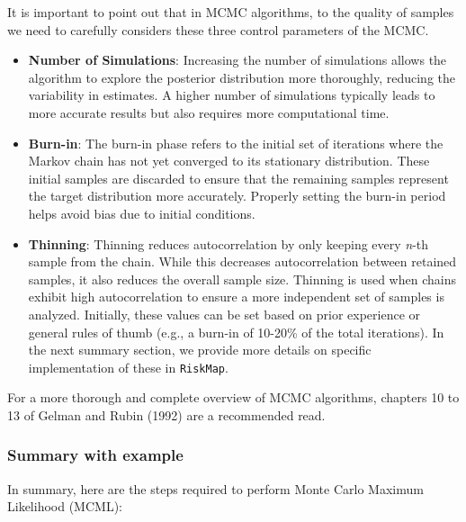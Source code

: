 \documentclass[
  letterpaper,
]{krantz}
\begin{document}
It is important to point out that in MCMC algorithms, to the quality of
samples we need to carefully considers these three control parameters of
the MCMC.

\begin{itemize}
\item
  \textbf{Number of Simulations}: Increasing the number of simulations
  allows the algorithm to explore the posterior distribution more
  thoroughly, reducing the variability in estimates. A higher number of
  simulations typically leads to more accurate results but also requires
  more computational time.
\item
  \textbf{Burn-in}: The burn-in phase refers to the initial set of
  iterations where the Markov chain has not yet converged to its
  stationary distribution. These initial samples are discarded to ensure
  that the remaining samples represent the target distribution more
  accurately. Properly setting the burn-in period helps avoid bias due
  to initial conditions.
\item
  \textbf{Thinning}: Thinning reduces autocorrelation by only keeping
  every \emph{n}-th sample from the chain. While this decreases
  autocorrelation between retained samples, it also reduces the overall
  sample size. Thinning is used when chains exhibit high autocorrelation
  to ensure a more independent set of samples is analyzed. Initially,
  these values can be set based on prior experience or general rules of
  thumb (e.g., a burn-in of 10-20\% of the total iterations). In the
  next summary section, we provide more details on specific
  implementation of these in \texttt{RiskMap}.
\end{itemize}

For a more thorough and complete overview of MCMC algorithms, chapters
10 to 13 of Gelman and Rubin (1992) are a recommended read.

\subsubsection{Summary with example}\label{sec-summary}

In summary, here are the steps required to perform Monte Carlo Maximum
Likelihood (MCML):
\end{document}
